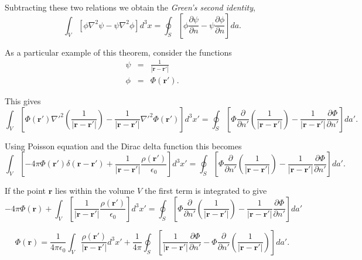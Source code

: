 Subtracting these two relations we obtain the \textit{Green's second identity},
\begin{equation}
\int_V \left[ \phi \nabla^2 \psi - \psi \nabla^2 \phi   \right] d^3x = \oint_S \left[ \phi \frac{\partial \psi}{\partial n} - \psi \frac{\partial \phi}{\partial n} \right] da. \label{eq:GreenSecondIdentity}
\end{equation}

As a particular example of this theorem, consider the functions 
\begin{eqnarray}
\psi &=& \frac{1}{\left| \textbf{r} - \textbf{r}' \right|}\\
\phi &=& \Phi(\textbf{r}').
\end{eqnarray}

This gives
\begin{equation}
\int_V \left[ \Phi (\textbf{r}') \nabla'^2 \left( \frac{1}{\left| \textbf{r} - \textbf{r}' \right|} \right) - \frac{1}{\left| \textbf{r} - \textbf{r}' \right|} \nabla'^2 \Phi (\textbf{r}')  \right] d^3x' = \oint_S \left[ \Phi \frac{\partial }{\partial n'} \left( \frac{1}{\left| \textbf{r} - \textbf{r}' \right|} \right) - \frac{1}{\left| \textbf{r} - \textbf{r}' \right|}  \frac{\partial \Phi}{\partial n'} \right] da'.
\end{equation}

Using Poisson equation and the Dirac delta function this becomes
\begin{equation}
\int_V \left[ -4\pi \Phi (\textbf{r}') \delta(\textbf{r} - \textbf{r}') + \frac{1}{\left| \textbf{r} - \textbf{r}' \right|} \frac{\rho(\textbf{r}')}{\epsilon_0}  \right] d^3x' = \oint_S \left[ \Phi \frac{\partial }{\partial n'} \left( \frac{1}{\left| \textbf{r} - \textbf{r}' \right|} \right) - \frac{1}{\left| \textbf{r} - \textbf{r}' \right|}  \frac{\partial \Phi}{\partial n'} \right] da'.
\end{equation}

If the point $\textbf{r}$ lies within the volume $V$ the first term is integrated to give
\begin{equation}
-4\pi \Phi (\textbf{r})+\int_V \left[  \frac{1}{\left| \textbf{r} - \textbf{r}' \right|} \frac{\rho(\textbf{r}')}{\epsilon_0}  \right] d^3x' = \oint_S \left[ \Phi \frac{\partial }{\partial n'} \left( \frac{1}{\left| \textbf{r} - \textbf{r}' \right|} \right) - \frac{1}{\left| \textbf{r} - \textbf{r}' \right|}  \frac{\partial \Phi}{\partial n'} \right] da'
\end{equation}

\begin{equation}
\Phi (\textbf{r})= \frac{1}{4\pi \epsilon_0} \int_V  \frac{\rho(\textbf{r}')}{\left| \textbf{r} - \textbf{r}' \right|}  d^3x'  + \frac{1}{4\pi} \oint_S \left[   \frac{1}{\left| \textbf{r} - \textbf{r}' \right|}  \frac{\partial \Phi}{\partial n'} - \Phi \frac{\partial }{\partial n'} \left( \frac{1}{\left| \textbf{r} - \textbf{r}' \right|} \right) \right] da'. \label{eq:GreenTheorem2}
\end{equation}

